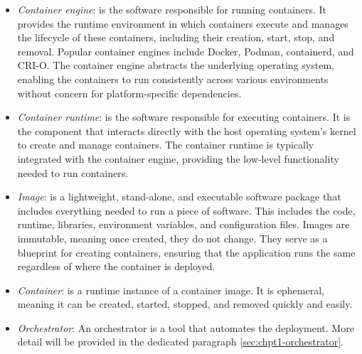 \begin{itemize}
  \itemsep0em
  \item \textit{Container engine}: is the software responsible for running
    containers. It provides the runtime environment in which containers execute
    and manages the lifecycle of these containers, including their creation,
    start, stop, and removal. Popular container engines include Docker, Podman,
    containerd, and CRI-O. The container engine abstracts the underlying
    operating system, enabling the containers to run consistently across various
    environments without concern for platform-specific dependencies.
  \item \textit{Container runtime}: is the software responsible for executing
    containers. It is the component that interacts directly with the host
    operating system's kernel to create and manage containers. The container
    runtime is typically integrated with the container engine, providing the
    low-level functionality needed to run containers.
  \item \textit{Image}: is a lightweight, stand-alone, and executable software
    package that includes everything needed to run a piece of software. This
    includes the code, runtime, libraries, environment variables, and
    configuration files. Images are immutable, meaning once created, they do not
    change. They serve as a blueprint for creating containers, ensuring that the
    application runs the same regardless of where the container is deployed.
  \item \textit{Container}: is a runtime instance of a container image. It is
    ephemeral, meaning it can be created, started, stopped, and removed quickly
    and easily.
  \item \textit{Orchestrator}: An orchestrator is a tool that automates the
    deployment. More detail will be provided in the dedicated paragraph
    \ref{sec:chpt1-orchestrator}.
\end{itemize}



